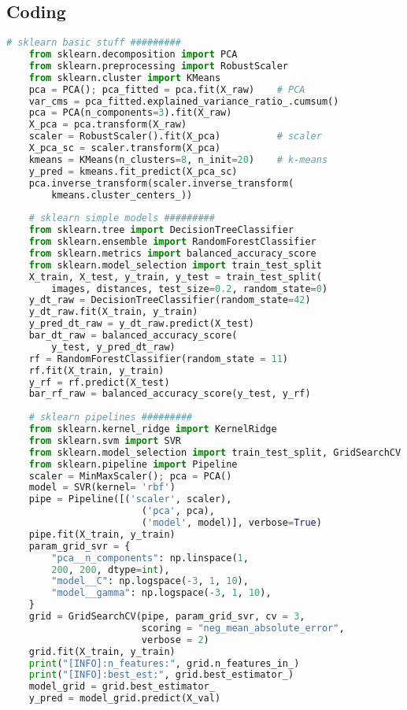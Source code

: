 \subsection{Coding}
{\footnotesize
\begin{lstlisting}[language=Python]
    # sklearn basic stuff #########
    from sklearn.decomposition import PCA
    from sklearn.preprocessing import RobustScaler
    from sklearn.cluster import KMeans
    pca = PCA(); pca_fitted = pca.fit(X_raw)    # PCA
    var_cms = pca_fitted.explained_variance_ratio_.cumsum()
    pca = PCA(n_components=3).fit(X_raw)
    X_pca = pca.transform(X_raw)
    scaler = RobustScaler().fit(X_pca)          # scaler
    X_pca_sc = scaler.transform(X_pca)
    kmeans = KMeans(n_clusters=8, n_init=20)    # k-means
    y_pred = kmeans.fit_predict(X_pca_sc)
    pca.inverse_transform(scaler.inverse_transform(
        kmeans.cluster_centers_))
    
    # sklearn simple models #########
    from sklearn.tree import DecisionTreeClassifier
    from sklearn.ensemble import RandomForestClassifier
    from sklearn.metrics import balanced_accuracy_score
    from sklearn.model_selection import train_test_split
    X_train, X_test, y_train, y_test = train_test_split(
        images, distances, test_size=0.2, random_state=0)
    y_dt_raw = DecisionTreeClassifier(random_state=42)  
    y_dt_raw.fit(X_train, y_train)
    y_pred_dt_raw = y_dt_raw.predict(X_test)
    bar_dt_raw = balanced_accuracy_score(
        y_test, y_pred_dt_raw)
    rf = RandomForestClassifier(random_state = 11)      
    rf.fit(X_train, y_train)
    y_rf = rf.predict(X_test)
    bar_rf_raw = balanced_accuracy_score(y_test, y_rf)
    
    # sklearn pipelines #########
    from sklearn.kernel_ridge import KernelRidge
    from sklearn.svm import SVR
    from sklearn.model_selection import train_test_split, GridSearchCV
    from sklearn.pipeline import Pipeline
    scaler = MinMaxScaler(); pca = PCA()
    model = SVR(kernel= 'rbf')
    pipe = Pipeline([('scaler', scaler),
                        ('pca', pca),
                        ('model', model)], verbose=True)
    pipe.fit(X_train, y_train)
    param_grid_svr = {
        "pca__n_components": np.linspace(1, 
        200, 200, dtype=int),
        "model__C": np.logspace(-3, 1, 10),
        "model__gamma": np.logspace(-3, 1, 10),
    }
    grid = GridSearchCV(pipe, param_grid_svr, cv = 3, 
                        scoring = "neg_mean_absolute_error", 
                        verbose = 2)
    grid.fit(X_train, y_train) 
    print("[INFO]:n_features:", grid.n_features_in_)
    print("[INFO]:best_est:", grid.best_estimator_)
    model_grid = grid.best_estimator_
    y_pred = model_grid.predict(X_val)
    

\end{lstlisting}}
